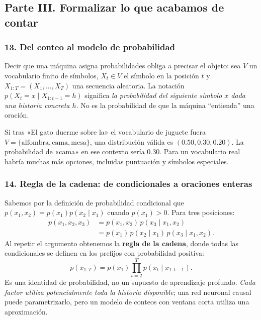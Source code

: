 

\subsection{Parte III. Formalizar lo que acabamos de contar}

\subsubsection*{13. Del conteo al modelo de probabilidad}
Decir que una máquina asigna probabilidades obliga a precisar el objeto: sea $V$ un vocabulario finito de símbolos, $X_t\in V$ el símbolo en la posición $t$ y $X_{1:T}=(X_1,\ldots,X_T)$ una secuencia aleatoria. La notación $p(X_t=x\mid X_{1:t-1}=h)$ significa \emph{la probabilidad del siguiente símbolo $x$ dada una historia concreta $h$}. No es la probabilidad de que la máquina ``entienda'' una oración.

\begin{ejemplo}
Si tras «El gato duerme sobre la» el vocabulario de juguete fuera $V=\{\text{alfombra},\text{cama},\text{mesa}\}$, una distribución válida es $(0.50,0.30,0.20)$. La probabilidad de «cama» en ese contexto sería $0.30$. Para un vocabulario real habría muchas más opciones, incluidas puntuación y símbolos especiales.
\end{ejemplo}

\subsubsection*{14. Regla de la cadena: de condicionales a oraciones enteras}
Sabemos por la definición de probabilidad condicional que $p(x_1,x_2)=p(x_1)p(x_2\mid x_1)$ cuando $p(x_1)>0$. Para tres posiciones:
\begin{align*}
p(x_1,x_2,x_3)&=p(x_1,x_2)\,p(x_3\mid x_1,x_2)\\
&=p(x_1)\,p(x_2\mid x_1)\,p(x_3\mid x_1,x_2).
\end{align*}
Al repetir el argumento obtenemos la \textbf{regla de la cadena}, donde todas las condicionales se definen en los prefijos con probabilidad positiva:
\[
\boxed{\displaystyle p(x_{1:T})=p(x_1)\prod_{t=2}^T p(x_t\mid x_{1:t-1}).}
\]
Es una identidad de probabilidad, no un supuesto de aprendizaje profundo. \emph{Cada factor utiliza potencialmente toda la historia disponible}; una red neuronal causal puede parametrizarlo, pero un modelo de conteos con ventana corta utiliza una aproximación.

